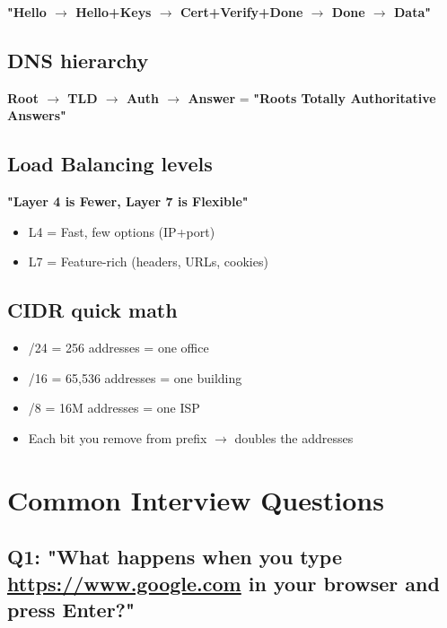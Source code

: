 \documentclass[11pt]{article}
\providecommand{\tightlist}{\setlength{\itemsep}{1pt}\setlength{\parskip}{0pt}}
\begin{document}
\textbf{"Hello \(\rightarrow\) Hello+Keys \(\rightarrow\) Cert+Verify+Done \(\rightarrow\) Done \(\rightarrow\) Data"}

\subsection{DNS hierarchy}\label{dns-hierarchy-1}

\textbf{Root \(\rightarrow\) TLD \(\rightarrow\) Auth \(\rightarrow\) Answer} = \textbf{"Root\textquotesingle s Totally Authoritative Answers"}

\subsection{Load Balancing levels}\label{load-balancing-levels}

\textbf{"Layer 4 is Fewer, Layer 7 is Flexible"}

\begin{itemize}
\tightlist
\item
  L4 = Fast, few options (IP+port)
\item
  L7 = Feature-rich (headers, URLs, cookies)
\end{itemize}

\subsection{CIDR quick math}\label{cidr-quick-math}

\begin{itemize}
\tightlist
\item
  /24 = 256 addresses = one office
\item
  /16 = 65,536 addresses = one building
\item
  /8 = 16M addresses = one ISP
\item
  Each bit you remove from prefix \(\rightarrow\) doubles the addresses
\end{itemize}

\section{Common Interview Questions}\label{common-interview-questions}

\subsection{\texorpdfstring{Q1: "What happens when you type \url{https://www.google.com} in your browser and press Enter?"}{Q1: "What happens when you type https://www.google.com in your browser and press Enter?"}}\label{q1-what-happens-when-you-type-httpswwwgooglecom-in-your-browser-and-press-enter}
\end{document}

